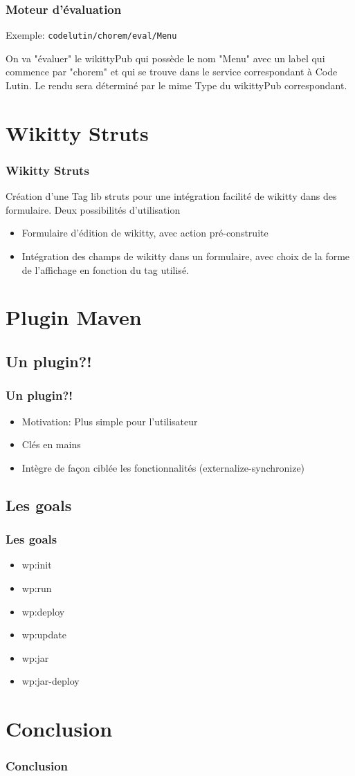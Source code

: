 \documentclass[12pt,a4paper,utf8x]{beamer}
\begin{document}
\begin{frame}\frametitle{Moteur d'évaluation}

Exemple:
\verb!codelutin/chorem/eval/Menu! 

On va "évaluer" le wikittyPub qui possède le nom "Menu" avec un label qui
commence par "chorem" et qui se trouve dans le service correspondant à Code Lutin.
Le rendu sera déterminé par le mime Type du wikittyPub correspondant.
\end{frame}





\section*{Wikitty Struts} 
\begin{frame}\frametitle{Wikitty Struts}
Création d'une Tag lib struts pour une intégration facilité de wikitty dans des 
formulaire.
Deux possibilités d'utilisation
\begin{itemize}
\item Formulaire d'édition de wikitty, avec action pré-construite 
\item Intégration des champs de wikitty dans un formulaire, avec choix de la forme
de l'affichage en fonction du tag utilisé.
\end{itemize}

\end{frame}


\section{Plugin Maven}
\subsection*{Un plugin?!}
\begin{frame}\frametitle{Un plugin?!}
\begin{itemize}
\item Motivation: Plus simple pour l'utilisateur
\item Clés en mains
\item Intègre de façon ciblée les fonctionnalités (externalize-synchronize)
\end{itemize}
\end{frame}	

\subsection*{Les goals}
\begin{frame}\frametitle{Les goals}
\begin{itemize}
\item wp:init
\item wp:run
\item wp:deploy
\item wp:update
\item wp:jar
\item wp:jar-deploy
\end{itemize}

\end{frame}	

\section{Conclusion}
\begin{frame}\frametitle{Conclusion}

\end{frame}	
\end{document}
